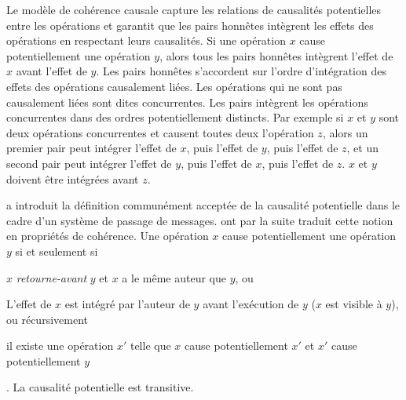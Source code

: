 Le modèle de cohérence causale capture les relations de causalités potentielles entre les opérations et garantit que les pairs honnêtes intègrent les effets des opérations en respectant leurs causalités.
Si une opération $x$ cause potentiellement une opération $y$, alors tous les pairs honnêtes intègrent l'effet de $x$ avant l'effet de $y$.
Les pairs honnêtes s'accordent sur l'ordre d'intégration des effets des opérations causalement liées.
Les opérations qui ne sont pas causalement liées sont dites concurrentes.
Les pairs intègrent les opérations concurrentes dans des ordres potentiellement distincts.
Par exemple si $x$ et $y$ sont deux opérations concurrentes et causent toutes deux l'opération $z$, alors un premier pair peut intégrer l'effet de $x$, puis l'effet de $y$, puis l'effet de $z$, et un second pair peut intégrer l'effet de $y$, puis l'effet de $x$, puis l'effet de $z$.
$x$ et $y$ doivent être intégrées avant $z$.

\textcite{lamport_1978_time} a introduit la définition communément acceptée de la causalité potentielle dans le cadre d'un système de passage de messages.
\textcite{hutto_1990_causal} ont par la suite traduit cette notion en propriétés de cohérence.
Une opération $x$ cause potentiellement une opération $y$ si et seulement si \begin{inlinelist}
    \item $x$ \emph{retourne-avant} $y$ et $x$ a le même auteur que $y$, ou
    \item L'effet de $x$ est intégré par l'auteur de $y$ avant l'exécution de $y$ ($x$ est visible à $y$), ou récursivement
    \item il existe une opération $x'$ telle que $x$ cause potentiellement $x'$ et $x'$ cause potentiellement $y$
\end{inlinelist}.
La causalité potentielle est transitive.

